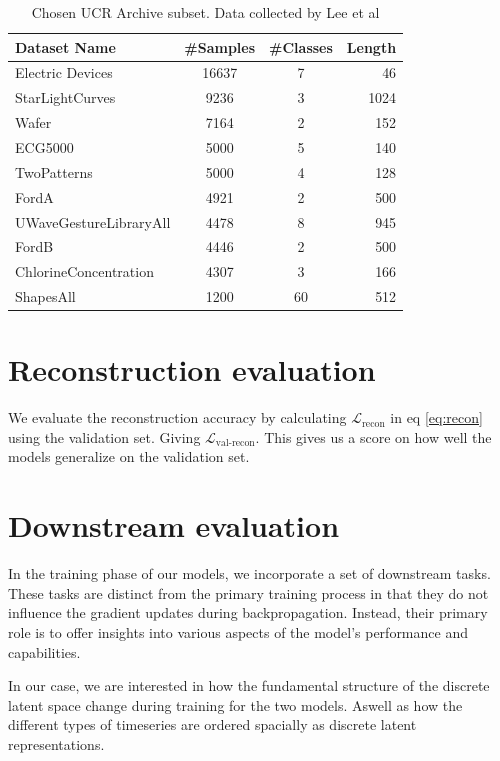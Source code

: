 \begin{table}[h]
    \centering
    \begin{tabular}{l c c r}
    \hline
    Dataset Name & \#Samples & \#Classes & Length \\
    \hline
    Electric Devices & 16637 & 7 & 46 \\
    StarLightCurves & 9236 & 3 & 1024 \\
    Wafer & 7164 & 2 & 152\\
    ECG5000 & 5000 & 5 & 140 \\
    TwoPatterns & 5000 & 4 & 128 \\
    FordA & 4921 & 2 & 500 \\
    UWaveGestureLibraryAll & 4478 & 8 & 945 \\
    FordB & 4446 & 2 & 500 \\
    ChlorineConcentration & 4307 & 3 & 166 \\
    ShapesAll & 1200 & 60 & 512 \\
    \end{tabular}
    \caption{Chosen UCR Archive subset. Data collected by Lee et al\cite{SSLs}}
    \label{tab:sample_table}
\end{table}

\section{Reconstruction evaluation}
We evaluate the reconstruction accuracy by calculating $\mathcal{L}_\text{recon}$ in eq \ref{eq:recon} using the validation set. 
Giving $\mathcal{L}_\text{val-recon}$.
This gives us a score on how well the models generalize on the validation set.


\section{Downstream evaluation}
In the training phase of our models, we incorporate a set of downstream tasks. These tasks are distinct from the primary training process in that they do not influence the gradient updates during backpropagation. Instead, their primary role is to offer insights into various aspects of the model's performance and capabilities.

In our case, we are interested in how the fundamental structure of the discrete latent space change during training for the two models. Aswell as how the different types of timeseries are ordered spacially as discrete latent representations. 


